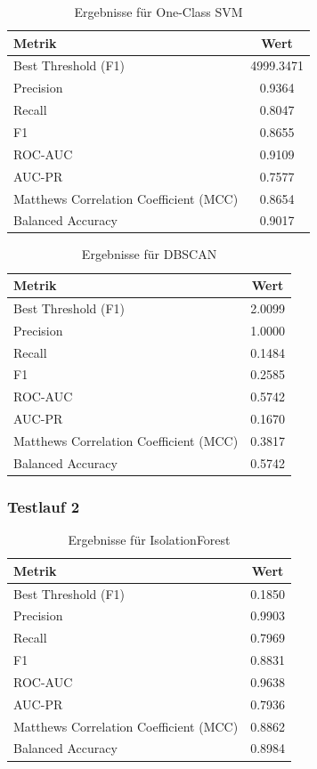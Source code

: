 \documentclass[a4paper,12pt]{article}
\begin{document}
	\begin{table}[H]
		\centering
		\begin{tabular}{l c}
			\hline
			Metrik & Wert \\
			\hline
			Best Threshold (F1) & 4999.3471 \\
			Precision & 0.9364 \\
			Recall & 0.8047 \\
			F1 & 0.8655 \\
			ROC-AUC & 0.9109 \\
			AUC-PR & 0.7577 \\
			Matthews Correlation Coefficient (MCC) & 0.8654 \\
			Balanced Accuracy & 0.9017 \\
			\hline
		\end{tabular}
		\caption{Ergebnisse für One-Class SVM}
	\end{table}
	
	\begin{table}[H]
		\centering
		\begin{tabular}{l c}
			\hline
			Metrik & Wert \\
			\hline
			Best Threshold (F1) & 2.0099 \\
			Precision & 1.0000 \\
			Recall & 0.1484 \\
			F1 & 0.2585 \\
			ROC-AUC & 0.5742 \\
			AUC-PR & 0.1670 \\
			Matthews Correlation Coefficient (MCC) & 0.3817 \\
			Balanced Accuracy & 0.5742 \\
			\hline
		\end{tabular}
		\caption{Ergebnisse für DBSCAN}
	\end{table}
	\subsubsection{Testlauf 2}
	
	\begin{table}[H]
		\centering
		\begin{tabular}{l c}
			\hline
			Metrik & Wert \\
			\hline
			Best Threshold (F1) & 0.1850 \\
			Precision & 0.9903 \\
			Recall & 0.7969 \\
			F1 & 0.8831 \\
			ROC-AUC & 0.9638 \\
			AUC-PR & 0.7936 \\
			Matthews Correlation Coefficient (MCC) & 0.8862 \\
			Balanced Accuracy & 0.8984 \\
			\hline
		\end{tabular}
		\caption{Ergebnisse für IsolationForest}
	\end{table}
	
\end{document}
